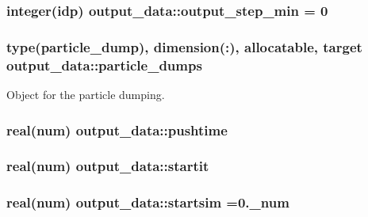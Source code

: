 \subsubsection[{\texorpdfstring{output\+\_\+step\+\_\+min}{output_step_min}}]{\setlength{\rightskip}{0pt plus 5cm}integer(idp) output\+\_\+data\+::output\+\_\+step\+\_\+min = 0}\hypertarget{namespaceoutput__data_aea2eeeb3470d4377a87117bb1aeb2ae4}{}\label{namespaceoutput__data_aea2eeeb3470d4377a87117bb1aeb2ae4}
\subsubsection[{\texorpdfstring{particle\+\_\+dumps}{particle_dumps}}]{\setlength{\rightskip}{0pt plus 5cm}type({\bf particle\+\_\+dump}), dimension(\+:), allocatable, target output\+\_\+data\+::particle\+\_\+dumps}\hypertarget{namespaceoutput__data_a5fbbbcc739158cb15a4a02aa8bc63399}{}\label{namespaceoutput__data_a5fbbbcc739158cb15a4a02aa8bc63399}


Object for the particle dumping. 

\subsubsection[{\texorpdfstring{pushtime}{pushtime}}]{\setlength{\rightskip}{0pt plus 5cm}real(num) output\+\_\+data\+::pushtime}\hypertarget{namespaceoutput__data_a1616b369a6e32a80c9448bff6371d1cf}{}\label{namespaceoutput__data_a1616b369a6e32a80c9448bff6371d1cf}
\subsubsection[{\texorpdfstring{startit}{startit}}]{\setlength{\rightskip}{0pt plus 5cm}real(num) output\+\_\+data\+::startit}\hypertarget{namespaceoutput__data_a41d55c93b7330583e6a58d151f8d187b}{}\label{namespaceoutput__data_a41d55c93b7330583e6a58d151f8d187b}
\subsubsection[{\texorpdfstring{startsim}{startsim}}]{\setlength{\rightskip}{0pt plus 5cm}real(num) output\+\_\+data\+::startsim =0.\+\_\+num}\hypertarget{namespaceoutput__data_a3eebf5510f6656fe8385302d2aba28d5}{}\label{namespaceoutput__data_a3eebf5510f6656fe8385302d2aba28d5}
